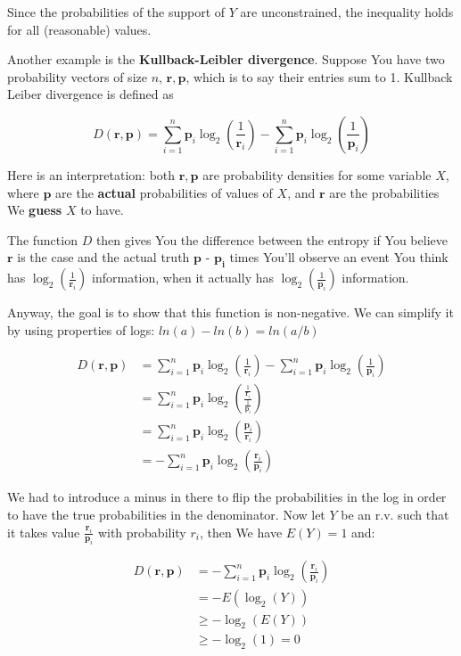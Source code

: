 \documentclass{article}
\begin{document}
		Since the probabilities of the support of $Y$ are unconstrained, the inequality holds for all (reasonable) values.
		
		Another example is the \textbf{Kullback-Leibler divergence}. Suppose You have two probability vectors of size $n$, $\bm{r}, \bm{p}$, which is to say their entries sum to 1. Kullback Leiber divergence is defined as
		
		\[ D(\bm{r}, \bm{p}) = \sum^n_{i=1} \bm{p}_i \log_2\left(\frac{1}{\bm{r}_i} \right) - \sum^n_{i=1} \bm{p}_i \log_2\left(\frac{1}{\bm{p}_i} \right) \]
			
		Here is an interpretation: both $\bm{r}, \bm{p}$ are probability densities for some variable $X$, where $\bm{p}$ are the \textbf{actual} probabilities of values of $X$, and $\bm{r}$ are the probabilities We \textbf{guess} $X$ to have.
		
		The function $D$ then gives You the difference between the entropy if You believe $\bm{r}$ is the case and the actual truth $\bm{p}$ - $\bm{p_i}$ times You'll observe an event You think has $\log_2\left(\frac{1}{\bm{r}_i} \right)$ information, when it actually has $\log_2\left(\frac{1}{\bm{p}_i} \right)$ information.
		
		Anyway, the goal is to show that this function is non-negative. We can simplify it by using properties of logs: $ln(a) - ln(b) = ln(a/b)$
		
		\begin{align*}
		D(\bm{r}, \bm{p}) &= \sum^n_{i=1} \bm{p}_i \log_2\left(\frac{1}{\bm{r}_i} \right) - \sum^n_{i=1} \bm{p}_i \log_2\left(\frac{1}{\bm{p}_i} \right)\\
		&= \sum^n_{i=1} \bm{p}_i \log_2\left(\frac{\frac{1}{\bm{r}_i}}{\frac{1}{\bm{p}_i}} \right)\\
		&= \sum^n_{i=1} \bm{p}_i \log_2\left(\frac{\bm{p}_i}{\bm{r}_i} \right)\\
		&= -\sum^n_{i=1} \bm{p}_i \log_2\left(\frac{\bm{r}_i}{\bm{p}_i} \right)
		\end{align*}
			
		We had to introduce a minus in there to flip the probabilities in the log in order to have the true probabilities in the denominator. Now let $Y$ be an r.v. such that it takes value $\frac{\bm{r}_i}{\bm{p}_i}$ with probability $r_i$, then We have $E(Y) = 1$ and:
		
		\begin{align*}
		D(\bm{r}, \bm{p}) &=-\sum^n_{i=1} \bm{p}_i \log_2\left(\frac{\bm{r}_i}{\bm{p}_i} \right)\\
		&= -E(\log_2(Y))\\
		&\ge -\log_2(E(Y)) \\
		&\ge -\log_2(1) = 0
		\end{align*}
			
\end{document}
